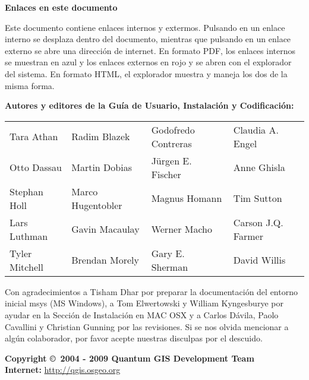 \textbf{Enlaces en este documento}

Este documento contiene enlaces internos y extermos. Pulsando en un
enlace interno se desplaza dentro del documento, mientras que pulsando en un enlace externo
se abre una dirección de internet. En formato PDF, los enlaces internos se muestran en azul y
los enlaces externos en rojo y se abren con el explorador del 
sistema. En formato HTML, el explorador muestra y maneja los dos de la misma forma. 

\begin{flushleft}
\textbf{Autores y editores de la Guía de Usuario, Instalación y Codificación:}
 
\begin{tabular}{p{4cm} p{4cm} p{4cm} p{4cm}}
Tara Athan & Radim Blazek & Godofredo Contreras & Claudia A. Engel \\
Otto Dassau & Martin Dobias & J\"urgen E. Fischer & Anne Ghisla \\ 
Stephan Holl & Marco Hugentobler & Magnus Homann & Tim Sutton \\ 
Lars Luthman & Gavin Macaulay & Werner Macho & Carson J.Q. Farmer \\
Tyler Mitchell & Brendan Morely & Gary E. Sherman & David Willis \\ 
\end{tabular}

\vspace{1cm}

Con agradecimientos a Tisham Dhar por preparar la documentación del entorno inicial msys (MS Windows), a Tom 
Elwertowski y William Kyngesburye por ayudar en la Sección de Instalación en MAC OSX y a Carlos D\'{a}vila, Paolo 
Cavallini y Christian Gunning por las revisiones. Si se nos olvida mencionar a algún 
colaborador, por favor acepte nuestras disculpas por el descuido.

\textbf{Copyright \copyright~2004 - 2009 Quantum GIS Development Team} \\
\textbf{Internet:} \url{http://qgis.osgeo.org}
\end{flushleft}

